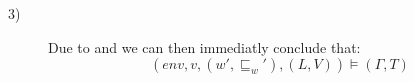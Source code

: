 \begin{description}
\item[3)] Due to  and  we can then immediatly conclude that:
	$$(env,v,(w',\sqsubseteq_w'),(L,V))\models(\Gamma,T)$$
\end{description}
